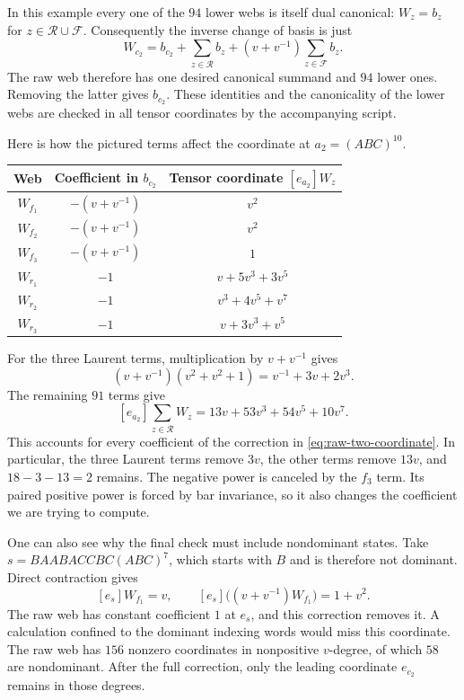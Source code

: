 \documentclass[a4paper,11pt]{amsart}
\newcommand{\word}[1]{#1}
\newcommand{\tpar}{v}
\numberwithin{equation}{subsection}
\theoremstyle{plain}
\theoremstyle{definition}
\theoremstyle{remark}
\begin{document}
In this example every one of the $94$ lower webs is itself dual
canonical: $W_z=b_z$ for $z\in\mathcal R\cup\mathcal F$.
Consequently the inverse change of basis is just
\[
W_{c_2}=b_{c_2}+\sum_{z\in\mathcal R}b_z
+(\tpar+\tpar^{-1})\sum_{z\in\mathcal F}b_z.
\]
The raw web therefore has one desired canonical summand and $94$ lower
ones. Removing the latter gives $b_{c_2}$. These identities and the
canonicality of the lower webs are checked in all tensor coordinates
by the accompanying script.

Here is how the pictured terms affect the coordinate at $a_2=(ABC)^{10}$.
\begin{center}
\begin{tabular}{ccc}
\toprule
Web&Coefficient in $b_{c_2}$&Tensor coordinate $[e_{a_2}]W_z$\\\midrule
$W_{f_1}$&$-(\tpar+\tpar^{-1})$&$\tpar^2$\\
$W_{f_2}$&$-(\tpar+\tpar^{-1})$&$\tpar^2$\\
$W_{f_3}$&$-(\tpar+\tpar^{-1})$&$1$\\\midrule
$W_{r_1}$&$-1$&$\tpar+5\tpar^3+3\tpar^5$\\
$W_{r_2}$&$-1$&$\tpar^3+4\tpar^5+\tpar^7$\\
$W_{r_3}$&$-1$&$\tpar+3\tpar^3+\tpar^5$\\\bottomrule
\end{tabular}
\end{center}
For the three Laurent terms, multiplication by $\tpar+\tpar^{-1}$ gives
\[
(\tpar+\tpar^{-1})(\tpar^2+\tpar^2+1)=\tpar^{-1}+3\tpar+2\tpar^3.
\]
The remaining $91$ terms give
\[
[e_{a_2}]\sum_{z\in\mathcal R}W_z
=13\tpar+53\tpar^3+54\tpar^5+10\tpar^7.
\]
This accounts for every coefficient of the correction in
\autoref{eq:raw-two-coordinate}. In particular, the three Laurent terms
remove $3\tpar$, the other terms remove $13\tpar$, and $18-3-13=2$ remains.
The negative power is canceled by the $f_3$ term. Its paired positive
power is forced by bar invariance, so it also changes the coefficient
we are trying to compute.

One can also see why the final check must include nondominant states.
Take $s=\word{BAABACCBC}(ABC)^7$, which starts with $B$ and is therefore
not dominant. Direct contraction gives
\[
[e_s]W_{f_1}=\tpar,\qquad
[e_s]\bigl((\tpar+\tpar^{-1})W_{f_1}\bigr)=1+\tpar^2.
\]
The raw web has constant coefficient $1$ at $e_s$, and this correction
removes it. A calculation confined to the dominant indexing words
would miss this coordinate. The raw web has $156$ nonzero coordinates
in nonpositive $\tpar$-degree, of which $58$ are nondominant. After the
full correction, only the leading coordinate $e_{c_2}$ remains in
those degrees.
\end{document}
